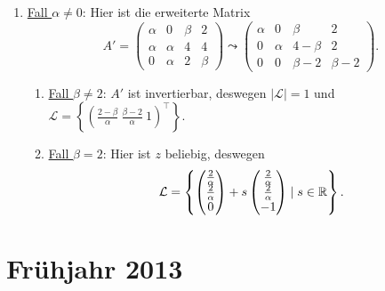 \begin{enumerate}
	\item \underline{Fall \( \alpha \neq 0 \)}: Hier ist die erweiterte Matrix
	\begin{equation*}
	 	A' = \left( \begin{array}{ccc|c}
	 		\alpha & 0 & \beta & 2 \\
	 		\alpha & \alpha & 4 & 4 \\
	 		0 & \alpha & 2 & \beta
	 	\end{array} \right) \leadsto \left( \begin{array}{ccc|c}
	 		\alpha & 0 & \beta & 2 \\
	 		0 & \alpha & 4-\beta & 2 \\
	 		0 & 0 & \beta-2 & \beta-2
	 	\end{array} \right) \text{.}
	 \end{equation*}
	 \begin{enumerate}
	 	\item \underline{Fall \( \beta \neq 2 \)}: \( A' \) ist invertierbar, deswegen \( |\mathcal{L}| = 1 \) und \( \mathcal{L} = \left \{ \left( \tfrac{2-\beta}{\alpha} \ \tfrac{\beta-2}{\alpha} \ 1 \right)^\top \right \} \).
	 	\item \underline{Fall \( \beta = 2 \)}: Hier ist \( z \) beliebig, deswegen
	 	\begin{equation*}
	 		\mathcal{L} = \left \{ \begin{pmatrix}
	 			\tfrac{2}{\alpha} \\ \tfrac{2}{\alpha} \\ 0
	 		\end{pmatrix} + s \begin{pmatrix}
	 			\tfrac{2}{\alpha} \\ \tfrac{2}{\alpha} \\ -1
	 		\end{pmatrix} \mid s \in \mathbb{R} \right \}\text{.}
	 	\end{equation*}
	 \end{enumerate}
\end{enumerate}

\newpage


\section{Frühjahr 2013}

